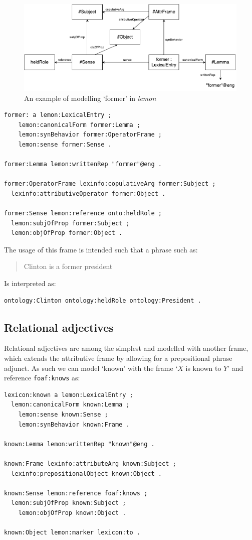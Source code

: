 \documentclass[11pt]{article}
\begin{document}
\begin{figure}
\includegraphics[width=\textwidth]{former-example}
\caption{An example of modelling `former' in \emph{lemon}\label{former-example}}
\end{figure}

\begin{verbatim}
former: a lemon:LexicalEntry ;
	lemon:canonicalForm former:Lemma ;
	lemon:synBehavior former:OperatorFrame ;
	lemon:sense former:Sense .

former:Lemma lemon:writtenRep "former"@eng .

former:OperatorFrame lexinfo:copulativeArg former:Subject ;
  lexinfo:attributiveOperator former:Object .
  
former:Sense lemon:reference onto:heldRole ;
  lemon:subjOfProp former:Subject ;
  lemon:objOfProp former:Object .
\end{verbatim}

The usage of this frame is intended such that a phrase such as:

\begin{quote}
Clinton is a former president
\end{quote}

Is interpreted as:

\begin{verbatim}
ontology:Clinton ontology:heldRole ontology:President .
\end{verbatim}

\subsection{Relational adjectives}

Relational adjectives are among the simplest and modelled with another frame,
which extends the attributive frame by allowing for a prepositional phrase
adjunct. As such we can model `known' with the frame `$X$ is known to $Y$' and
reference {\tt foaf:knows} as:

\begin{verbatim}
lexicon:known a lemon:LexicalEntry ;
  lemon:canonicalForm known:Lemma ;
	lemon:sense known:Sense ;
	lemon:synBehavior known:Frame .

known:Lemma lemon:writtenRep "known"@eng .

known:Frame lexinfo:attributeArg known:Subject ;
  lexinfo:prepositionalObject known:Object .

known:Sense lemon:reference foaf:knows ;
  lemon:subjOfProp known:Subject ;
	lemon:objOfProp known:Object .
	
known:Object lemon:marker lexicon:to .
\end{verbatim}
\end{document}
